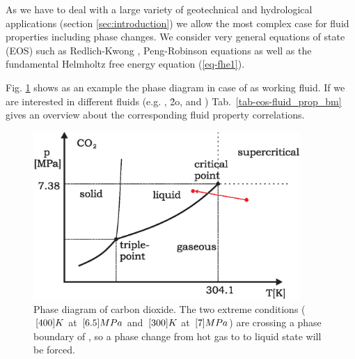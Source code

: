 
As we have to deal with a large variety of geotechnical and hydrological applications (section \ref{sec:introduction})
we allow the most complex case for fluid properties including phase changes.
We consider very general equations of state (EOS) such as Redlich-Kwong \cite{RedKwo:49}, Peng-Robinson \cite{PenRob:75} equations as well as the fundamental Helmholtz free energy equation (\ref{eq-fhe1}).

Fig. \ref{fig-eos-phase} shows as an example the phase diagram in case of  as working fluid.
%
If we are interested in different fluids (e.g. , \h2o, and ) 
Tab.~\ref{tab-eos-fluid_prop_bm} gives an overview about the corresponding fluid property correlations.

\begin{figure}[htb]
\centering
\includegraphics[width=0.9\textwidth]{figures/phase-diagram-co2.eps}
\caption{Phase diagram of carbon dioxide. The two extreme conditions ($\, \mathrm{[}400]{K}$ at $\, \mathrm{[}6.5]{MPa}$ and $\, \mathrm{[}300]{K}$ at $\, \mathrm{[}7]{MPa}$) are crossing a phase boundary of , so a phase change from hot gas to  to liquid state will be forced.}
\label{fig-eos-phase}
\end{figure}

